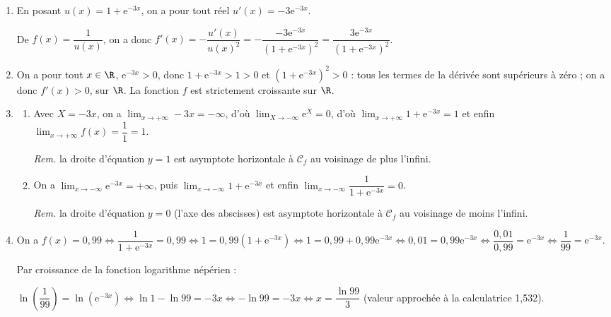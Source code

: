 \begin{enumerate}
\item 


En posant $u(x) = 1 + \text{e}^{- 3x}$, on a pour tout réel $u'(x) = -3\text{e}^{- 3x}$.

De $f(x) = \dfrac{1}{u(x)}$, on a donc $f'(x) = - \dfrac{u'(x)}{u(x)^2} = - \dfrac{-3\text{e}^{- 3x}}{\left(1 + \text{e}^{- 3x}\right)^2} = \dfrac{3\text{e}^{- 3x}}{\left(1 + \text{e}^{- 3x}\right)^2}$. 
\item 
On a pour tout $x \in \R$, \: $\text{e}^{- 3x} > 0$, donc $1 + \text{e}^{- 3x} > 1 > 0$ et $\left(1 + \text{e}^{- 3x}\right)^2 > 0$ : tous les termes de la dérivée sont supérieurs à zéro ; on a donc $f'(x) > 0$, sur $\R$. La fonction $f$ est strictement croissante sur $\R$.
\item
	\begin{enumerate}
		\item 
Avec $X = - 3x$, on a $\displaystyle\lim_{x \to + \infty} -3x = - \infty$, d'où $\displaystyle\lim_{X \to - \infty} \text{e}^{X} = 0$, d'où $\displaystyle\lim_{x \to + \infty}1 + \text{e}^{-3x} = 1$ et enfin $\displaystyle\lim_{x \to + \infty}f(x) = \dfrac11 = 1$.

\emph{Rem.} la droite d'équation $y = 1 $ est asymptote horizontale à $\mathcal{C}_f$ au voisinage de plus l'infini.
		\item 
On a $\displaystyle\lim_{x \to -\infty}\text{e}^{-3x} = + \infty$, puis $\displaystyle\lim_{x \to -\infty}1 + \text{e}^{-3x}$ et enfin $\displaystyle\lim_{x \to -\infty}\dfrac{1}{1 + \text{e}^{-3x}} = 0$.

\emph{Rem.} la droite d'équation $y = 0$ (l'axe des abscisses) est asymptote horizontale à $\mathcal{C}_f$ au voisinage de moins l'infini.
	\end{enumerate}
\item 
On a $f(x) = 0,99 \iff \dfrac{1}{1 + \text{e}^{- 3x}} = 0,99 \iff 1 = 0,99\left(1 + \text{e}^{- 3x}\right) \iff 1 = 0,99 + 0,99\text{e}^{- 3x} \iff 0,01 = 0,99\text{e}^{- 3x} \iff \dfrac{0,01}{0,99} = \text{e}^{- 3x}\iff \dfrac{1}{99} = \text{e}^{- 3x}$.

Par croissance de la fonction logarithme népérien :

$\ln\left(\dfrac{1}{99}\right) = \ln \left(\text{e}^{- 3x}\right)\iff \ln 1 - \ln 99 = - 3x \iff - \ln 99 = - 3x \iff x = \dfrac{\ln 99}{3}$ \quad (valeur approchée à la calculatrice 1,532).
\end{enumerate}

\bigskip

